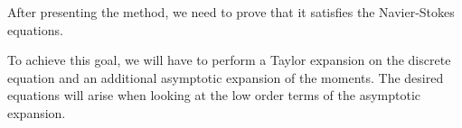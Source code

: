 After presenting the method, we need to prove that it satisfies the Navier-Stokes equations.

To achieve this goal, we will have to perform a Taylor expansion on the discrete equation and an additional asymptotic expansion of the moments.
The desired equations will arise when looking at the low order terms of the asymptotic expansion.
